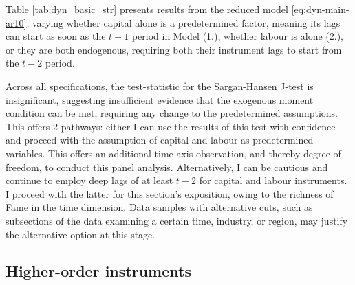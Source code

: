 Table \ref{tab:dyn_basic_str} presents results from the reduced model
\eqref{eq:dyn-main-ar10}, varying whether capital alone is a predetermined factor,
meaning its lags can start as soon as the $t-1$ period in Model (1.),
whether labour is alone (2.), or they are both endogenous,
requiring both their instrument lags to start from the $t-2$ period.
\par
Across all specifications, the test-statistic for the Sargan-Hansen J-test
is insignificant, suggesting insufficient evidence that the exogenous moment condition
can be met, requiring any change to the predetermined assumptions.
This offers 2 pathways: either I can use the results of this test with confidence
and proceed with the assumption of capital and labour as predetermined variables.
This offers an additional time-axis observation, and thereby degree of freedom,
to conduct this panel analysis.
Alternatively, I can be cautious and continue to employ deep lags of at least $t-2$
for capital and labour instruments.
I proceed with the latter for this section's exposition,
owing to the richness of Fame in the time dimension.
Data samples with alternative cuts, such as subsections of the data examining
a certain time, industry, or region, may justify the alternative option at this stage.

\newpage
\subsection{Higher-order instruments}
\label{ss:dyn-instr-ho}

